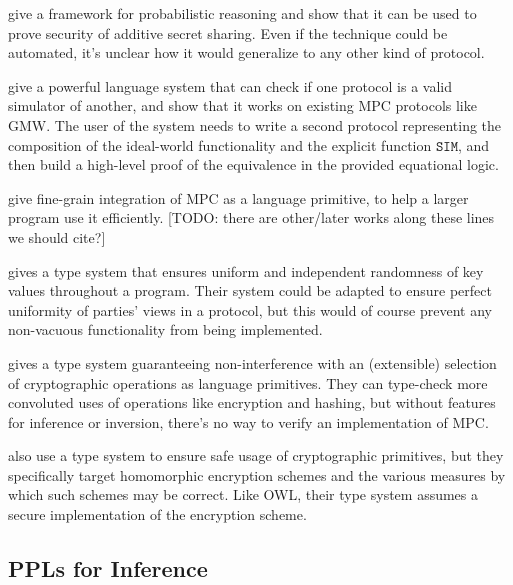 \documentclass[conference]{IEEEtran}
\begin{document}
\cite{Barth et al} %
give a framework for probabilistic reasoning and show that it can be used to prove security of additive secret sharing.
Even if the technique could be automated, it's unclear how it would generalize to any other kind of protocol.

\cite{Gancher et al} %
give a powerful language system that can check if one protocol is a valid simulator of another,
and show that it works on existing MPC protocols like GMW.
The user of the system needs to write a second protocol
representing the composition of the ideal-world functionality and the explicit function $\mathtt{SIM}$,
and then build a high-level proof of the equivalence in the provided equational logic.

\cite{Wysteria} %
give fine-grain integration of MPC as a language primitive, to help a larger program use it efficiently.
[TODO: there are other/later works along these lines we should cite?]

\cite{lambda-obliv} %
gives a type system that ensures uniform and independent randomness of key values throughout a program.
Their system could be adapted to ensure perfect uniformity of parties' views in a protocol,
but this would of course prevent any non-vacuous functionality from being implemented.

\cite{OWL} %
gives a type system guaranteeing non-interference with an (extensible) selection of cryptographic operations as language primitives.
They can type-check more convoluted uses of operations like encryption and hashing, but without features for inference or inversion,
there's no way to verify an implementation of MPC.

\cite{Fournet et al} %
also use a type system to ensure safe usage of cryptographic primitives,
but they specifically target homomorphic encryption schemes and the various measures by which such schemes may be correct.
Like OWL, their type system assumes a secure implementation of the encryption scheme.

\subsection{PPLs for Inference}
\end{document}
